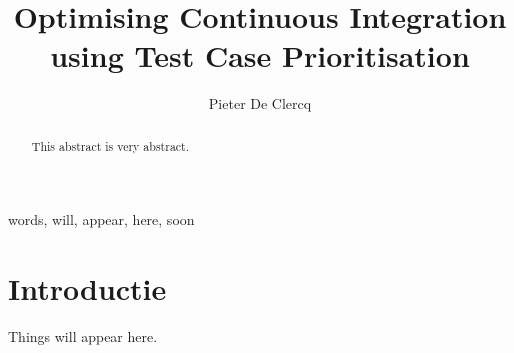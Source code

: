 \documentclass[10pt,twocolumn,twoside]{phdsymp-en}
\begin{document}
	\title{Optimising Continuous Integration using Test Case Prioritisation}
	\author{Pieter De Clercq}
	\maketitle
	
	\begin{abstract}
		This abstract is very abstract.
	\end{abstract}

	\begin{keywords}
		words, will, appear, here, soon
	\end{keywords}

	\section{Introductie}
	Things will appear here. \cite{cusumanomicrosoft}
	
	
	
\end{document}
